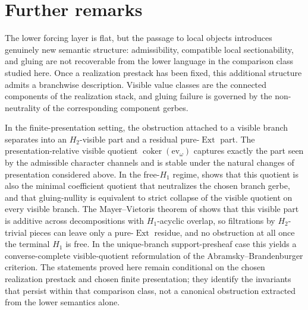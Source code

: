 \section{Further remarks}\label{sec:conclusion}

The lower forcing layer is flat, but the passage to local objects introduces genuinely new semantic structure: admissibility, compatible local sectionability, and gluing are not recoverable from the lower language in the comparison class studied here. Once a realization prestack has been fixed, this additional structure admits a branchwise description. Visible value classes are the connected components of the realization stack, and gluing failure is governed by the non-neutrality of the corresponding component gerbes.

In the finite-presentation setting, the obstruction attached to a visible branch separates into an $H_2$-visible part and a residual pure-$\operatorname{Ext}$ part. The presentation-relative visible quotient $\operatorname{coker}(\mathrm{ev}_{\omega})$ captures exactly the part seen by the admissible character channels and is stable under the natural changes of presentation considered above. In the free-$H_1$ regime,  shows that this quotient is also the minimal coefficient quotient that neutralizes the chosen branch gerbe, and that gluing-nullity is equivalent to strict collapse of the visible quotient on every visible branch. The Mayer--Vietoris theorem of  shows that this visible part is additive across decompositions with $H_1$-acyclic overlap, so filtrations by $H_2$-trivial pieces can leave only a pure-$\operatorname{Ext}$ residue, and no obstruction at all once the terminal $H_1$ is free. In the unique-branch support-presheaf case this yields a converse-complete visible-quotient reformulation of the Abramsky--Brandenburger criterion. The statements proved here remain conditional on the chosen realization prestack and chosen finite presentation; they identify the invariants that persist within that comparison class, not a canonical obstruction extracted from the lower semantics alone.
